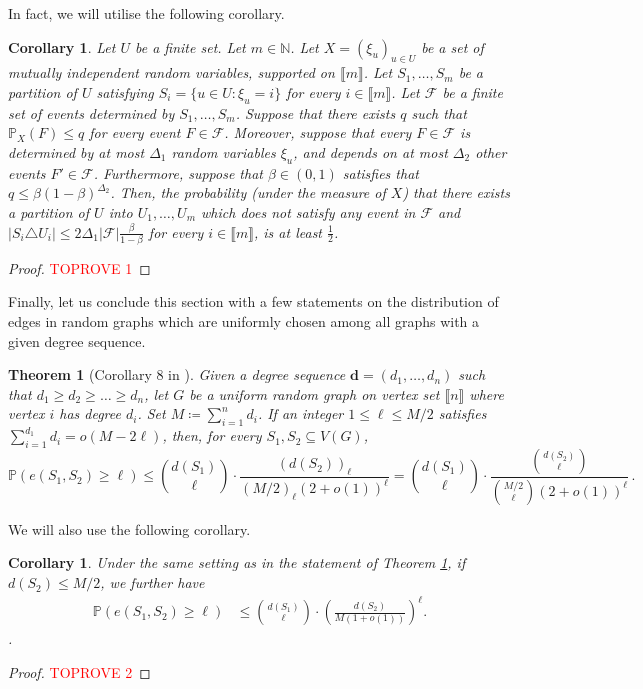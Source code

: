 \documentclass[notitlepage]{scrartcl}
\newcommand{\br}[1]{\llbracket{#1}\rrbracket}
\newtheorem{theorem}{Theorem}
\newtheorem{corollary}[thm]{Corollary}
\begin{document}
In fact, we will utilise the following corollary.
\begin{corollary}\label{cor: lll}
Let $U$ be a finite set. Let $m\in \mathbb{N}$. Let $X=(\xi_u)_{u\in U}$ be a set of mutually independent random variables, supported on $\br{m}$. Let $S_1,\ldots, S_{m}$ be a partition of $U$ satisfying $S_i=\{u\in U\colon \xi_u=i\}$ for every $i \in \br{m}$. Let $\mathcal{F}$ be a finite set of events determined by $S_1,\ldots, S_m$. Suppose that there exists $q$ such that $\mathbb{P}_X(F)\le q$ for every event $F\in \mathcal{F}$. Moreover, suppose that every $F\in \mathcal{F}$ is determined by at most $\Delta_1$ random variables $\xi_u$, and depends on at most $\Delta_2$ other events $F'\in \mathcal{F}$. Furthermore, suppose that $\beta\in (0,1)$ satisfies that $q\le \beta(1-\beta)^{\Delta_2}$. 
Then, the probability (under the measure of $X$) that there exists a partition of $U$ into $U_1,\ldots, U_m$ which does not satisfy any event in $\mathcal{F}$ and $\big|S_i\triangle U_i\big|\le 2\Delta_1|\mathcal{F}|\frac{\beta}{1-\beta}$ for every $i\in \br{m}$, is at least $\frac{1}{2}$.
\end{corollary}
\begin{proof}\textcolor{red}{TOPROVE 1}\end{proof}

Finally, let us conclude this section with a few statements on the distribution of edges in random graphs which are uniformly chosen among all graphs with a given degree sequence.
\begin{theorem}[Corollary 8 in \cite{gao2023subgraph}]\label{th:gao}
    Given a degree sequence $\mathbf{d} = (d_1, \dots, d_n)$ such that $d_1 \ge d_2 \ge \dots \ge d_n$, let $G$ be a uniform random graph on vertex set $\br{n}$ where vertex $i$ has degree $d_i$. Set $M \coloneqq \sum_{i=1}^{n} d_i$. If an integer $1 \le \ell \le M/2$ satisfies $\sum_{i=1}^{d_1} d_i = o(M - 2\ell)$, then, for every $S_1, S_2 \subseteq V(G)$,
    \[
        \mathbb{P}\left(e(S_1, S_2) \ge \ell\right) \le \binom{d(S_1)}{\ell} \cdot \frac{(d(S_2))_\ell}{(M/2)_\ell (2 + o(1))^\ell} = \binom{d(S_1)}{\ell} \cdot \frac{\binom{d(S_2)}{\ell}}{\binom{M/2}{\ell} (2 + o(1))^\ell}\,.
    \]
\end{theorem}
We will also use the following corollary.
\begin{corollary}\label{cor: gao}
Under the same setting as in the statement of Theorem \ref{th:gao}, if $d(S_2)\le M/2$, we further have
    \begin{align*}
        \mathbb{P}\left(e(S_1, S_2) \ge \ell\right) &\le \binom{d(S_1)}{\ell} \cdot \left(\frac{d(S_2)}{M (1 + o(1))}\right)^\ell.
    \end{align*}. 
\end{corollary}
\begin{proof}\textcolor{red}{TOPROVE 2}\end{proof}
\end{document}
